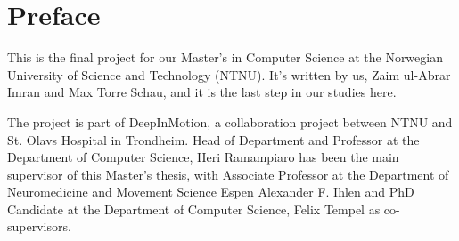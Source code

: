 \chapter*{Preface}
This is the final project for our Master's in Computer Science at the Norwegian University of Science and Technology (NTNU). It's written by us, Zaim ul-Abrar Imran and Max Torre Schau, and it is the last step in our studies here.

The project is part of DeepInMotion, a collaboration project between NTNU and St. Olavs Hospital in Trondheim. Head of Department and Professor at the Department of Computer Science, Heri Ramampiaro has been the main supervisor of this Master's thesis, with Associate Professor at the Department of Neuromedicine and Movement Science Espen Alexander F. Ihlen and  PhD Candidate at the Department of Computer Science, Felix Tempel as co-supervisors. 